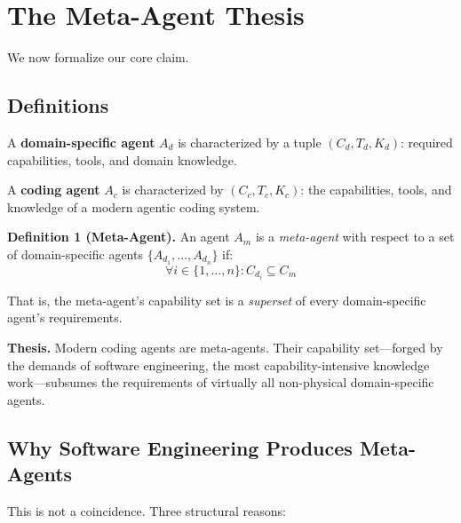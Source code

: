 \section{The Meta-Agent Thesis}

We now formalize our core claim.

\subsection{Definitions}

A \textbf{domain-specific agent} $A_d$ is characterized by a tuple $(C_d, T_d, K_d)$: required capabilities, tools, and domain knowledge.

A \textbf{coding agent} $A_c$ is characterized by $(C_c, T_c, K_c)$: the capabilities, tools, and knowledge of a modern agentic coding system.

\textbf{Definition 1 (Meta-Agent).} An agent $A_m$ is a \textit{meta-agent} with respect to a set of domain-specific agents $\{A_{d_1}, \ldots, A_{d_n}\}$ if:
$$\forall i \in \{1, \ldots, n\}: C_{d_i} \subseteq C_m$$

That is, the meta-agent's capability set is a \textit{superset} of every domain-specific agent's requirements.

\textbf{Thesis.} Modern coding agents are meta-agents. Their capability set---forged by the demands of software engineering, the most capability-intensive knowledge work---subsumes the requirements of virtually all non-physical domain-specific agents.

\subsection{Why Software Engineering Produces Meta-Agents}

This is not a coincidence. Three structural reasons:

